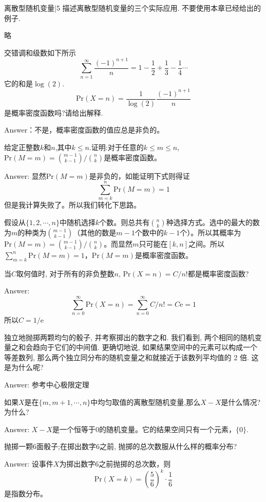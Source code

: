 \newChapter 离散型随机变量|5
\exer 描述离散型随机变量的三个实际应用. 不要使用本章已经给出的例子.\par
略

\exer 交错调和级数如下所示
\[\sum_{n=1}^\infty\frac{(-1)^{n+1}}{n}=1-\frac{1}{2}+\frac{1}{3}-\frac{1}{4}\cdots\]
它的和是$\log(2)$.
\[\mathrm{Pr}(X=n)=\frac{1}{\log(2)}\frac{(-1)^{n+1}}{n}\]
是概率密度函数吗?请给出解释.\par
Answer：不是，概率密度函数的值应总是非负的。

\exer 给定正整数$k$和$n$,其中$k\le n$.证明:对于任意的$k\le m\le n$,$\mathrm{Pr}(M=m)=\binom{m-1}{k-1}/\binom{n}{k}$是概率密度函数。\par
Answer: 显然$\mathrm{Pr}(M=m)$是非负的，如能证明下式则得证
\[\sum_{m=k}^n \mathrm{Pr}(M=m)=1\]
但是我计算失败了。所以我们转化下思路。\par
假设从$\{1,2,\cdots, n\}$中随机选择$k$个数。则总共有$\binom{n}{k}$种选择方式。选中的最大的数为$m$的种类为$\binom{m-1}{k-1}$（其他的数是$m-1$个数中的$k-1$个）。所以其概率为$\mathrm{Pr}(M=m)=\binom{m-1}{k-1}/\binom{n}{k}$。而显然$m$只可能在$[k, n]$之间。所以$\sum_{m=k}^n \mathrm{Pr}(M=m)=1$，$\mathrm{Pr}(M=m)$是概率密度函数。

\exer 当$C$取何值时, 对于所有的非负整数$n$, $\mathrm{Pr}(X = n) = C/n!$都是概率密度函数?\par
Answer: 
\[\sum_{n=0}^\infty\mathrm{Pr}(X=n)=\sum_{n=0}^\infty C/n! = C\mathrm{e} = 1 \]
所以$C=1/\mathrm{e}$

\exer 独立地抛掷两颗均匀的骰子, 并考察掷出的数字之和. 我们看到, 两个相同的随机变量之和会趋向于它们的中间值. 更确切地说, 如果结果空间中的元素可以构成一个等差数列, 那么两个独立同分布的随机变量之和就接近于该数列平均值的 2 倍. 这是为什么呢?\par
Answer: 参考中心极限定理

\exer 如果$X$是在$\{m,m+1,\cdots ,n\}$中均匀取值的离散型随机变量,那么$X-X$是什么情况?为什么?\par
Answer: $X-X$是一个恒等于0的随机变量。它的结果空间只有一个元素，$\{0\}$.

\exer 抛掷一颗6面骰子;在掷出数字6之前, 抛掷的总次数服从什么样的概率分布?\par
Answer: 设事件$X$为掷出数字6之前抛掷的总次数，则
\[\mathrm{Pr}(X=k)=\left(\frac{5}{6}\right)^k\cdot\frac{1}{6}\]
是指数分布。